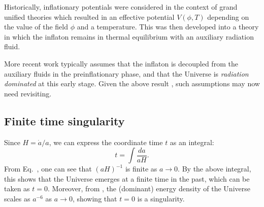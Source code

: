 Historically, inflationary potentials were considered in the context of
grand unified theories \citep{PhysRevLett.48.1220,linde_1982} which
resulted in an effective potential $V(\phi,T)$ depending on the value
of the field $\phi$ and a temperature.
This was then developed
\citep{1995PhRvL..74.1912B,PhysRevLett.75.3218} into a theory in which
the inflaton remains in thermal equilibrium with an auxiliary
radiation fluid.

More recent work \citep{2007PhRvD..76f3512P} typically assumes that
the inflaton is decoupled from the auxiliary fluids in the
preinflationary phase, and that the Universe is {\em radiation
dominated\/} at this early stage. Given the above result
, such assumptions may now need revisiting.



\subsection{Finite time singularity}

Since $H = \dot{a}/a$, we can express the coordinate time $t$ as an
integral: 
%
\begin{equation}
  t = \int \frac{da}{aH}.
\end{equation}
%
From Eq.\ , one can see that $(aH)^{-1}$ is
finite as $a\to0$. By the above integral, this shows that the Universe
emerges at a finite time in the past, which can be taken as $t=0$.
Moreover, from , the (dominant) energy density of
the Universe scales as $a^{-6}$ as $a \to 0$, showing that $t=0$ is a
singularity.

